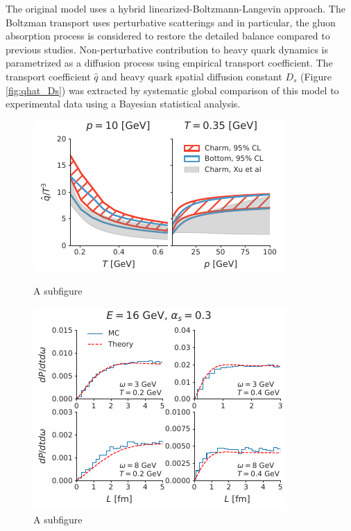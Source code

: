 \documentclass[12pt,a4paper]{article}
\begin{document}
The original model uses a hybrid linearized-Boltzmann-Langevin approach. The Boltzman transport uses perturbative scatterings and in particular, the gluon absorption process is considered to restore the detailed balance compared to previous studies. 
Non-perturbative contribution to heavy quark dynamics is parametrized as a diffusion process using empirical transport coefficient.
The transport coefficient $\hat{q}$ and heavy quark spatial diffusion constant $D_s$ (Figure \ref{fig:qhat_Ds}) was extracted by systematic  global comparison of this model to experimental data using a Bayesian statistical analysis.
\begin{figure}[ht]
\centering
\begin{minipage}{.51\textwidth}
  \centering
  \includegraphics[width=\linewidth]{qhat_p_T.pdf}
  \caption{A subfigure}\label{fig:qhat_Ds}
\end{minipage}
\begin{minipage}{.48\textwidth}
  \centering
  \includegraphics[width=\linewidth]{spectrum_L.pdf}
  \caption{A subfigure}\label{fig:spectra}
\end{minipage}
\end{figure}
\end{document}
